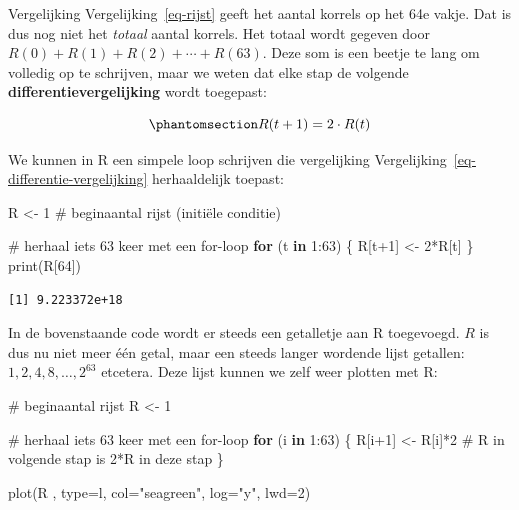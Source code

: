 \documentclass[
  a4paper,
]{scrbook}
\newenvironment{Shaded}{\begin{snugshade}}{\end{snugshade}}
\newcommand{\AttributeTok}[1]{\textcolor[rgb]{0.40,0.45,0.13}{#1}}
\newcommand{\CommentTok}[1]{\textcolor[rgb]{0.37,0.37,0.37}{#1}}
\newcommand{\ControlFlowTok}[1]{\textcolor[rgb]{0.00,0.23,0.31}{\textbf{#1}}}
\newcommand{\DecValTok}[1]{\textcolor[rgb]{0.68,0.00,0.00}{#1}}
\newcommand{\FunctionTok}[1]{\textcolor[rgb]{0.28,0.35,0.67}{#1}}
\newcommand{\NormalTok}[1]{\textcolor[rgb]{0.00,0.23,0.31}{#1}}
\newcommand{\OtherTok}[1]{\textcolor[rgb]{0.00,0.23,0.31}{#1}}
\newcommand{\SpecialCharTok}[1]{\textcolor[rgb]{0.37,0.37,0.37}{#1}}
\newcommand{\StringTok}[1]{\textcolor[rgb]{0.13,0.47,0.30}{#1}}
\theoremstyle{definition}
\theoremstyle{remark}
\begin{document}
Vergelijking Vergelijking~\ref{eq-rijst} geeft het aantal korrels op het
64e vakje. Dat is dus nog niet het \emph{totaal} aantal korrels. Het
totaal wordt gegeven door \(R(0) + R(1) + R(2) + \cdots + R(63)\). Deze
som is een beetje te lang om volledig op te schrijven, maar we weten dat
elke stap de volgende \textbf{differentievergelijking} wordt toegepast:

\begin{equation}\phantomsection\label{eq-differentie-vergelijking}{
R(t+1) = 2\cdot R(t) 
}\end{equation}

We kunnen in R een simpele loop schrijven die vergelijking
Vergelijking~\ref{eq-differentie-vergelijking} herhaaldelijk toepast:

\begin{Shaded}
\begin{Highlighting}[]
\NormalTok{R }\OtherTok{\textless{}{-}} \DecValTok{1} \CommentTok{\# beginaantal rijst (initiële conditie)}

\CommentTok{\# herhaal iets 63 keer met een for{-}loop}
\ControlFlowTok{for}\NormalTok{ (t }\ControlFlowTok{in} \DecValTok{1}\SpecialCharTok{:}\DecValTok{63}\NormalTok{) \{}
\NormalTok{  R[t}\SpecialCharTok{+}\DecValTok{1}\NormalTok{] }\OtherTok{\textless{}{-}} \DecValTok{2}\SpecialCharTok{*}\NormalTok{R[t]}
\NormalTok{\}}
\FunctionTok{print}\NormalTok{(R[}\DecValTok{64}\NormalTok{])}
\end{Highlighting}
\end{Shaded}

\begin{verbatim}
[1] 9.223372e+18
\end{verbatim}

In de bovenstaande code wordt er steeds een getalletje aan R toegevoegd.
\(R\) is dus nu niet meer één getal, maar een steeds langer wordende
lijst getallen: \(1, 2, 4, 8, \dots, 2^{63}\) etcetera. Deze lijst
kunnen we zelf weer plotten met R:

\begin{Shaded}
\begin{Highlighting}[]
\CommentTok{\# beginaantal rijst}
\NormalTok{R }\OtherTok{\textless{}{-}} \DecValTok{1}

\CommentTok{\# herhaal iets 63 keer met een for{-}loop}
\ControlFlowTok{for}\NormalTok{ (i }\ControlFlowTok{in} \DecValTok{1}\SpecialCharTok{:}\DecValTok{63}\NormalTok{) \{}
\NormalTok{  R[i}\SpecialCharTok{+}\DecValTok{1}\NormalTok{] }\OtherTok{\textless{}{-}}\NormalTok{ R[i]}\SpecialCharTok{*}\DecValTok{2} \CommentTok{\# R in volgende stap is 2*R in deze stap}
\NormalTok{\}}

\FunctionTok{plot}\NormalTok{(R , }\AttributeTok{type=}\StringTok{\textquotesingle{}l\textquotesingle{}}\NormalTok{, }\AttributeTok{col=}\StringTok{"seagreen"}\NormalTok{, }\AttributeTok{log=}\StringTok{"y"}\NormalTok{, }\AttributeTok{lwd=}\DecValTok{2}\NormalTok{) }
\end{Highlighting}
\end{Shaded}
\end{document}
